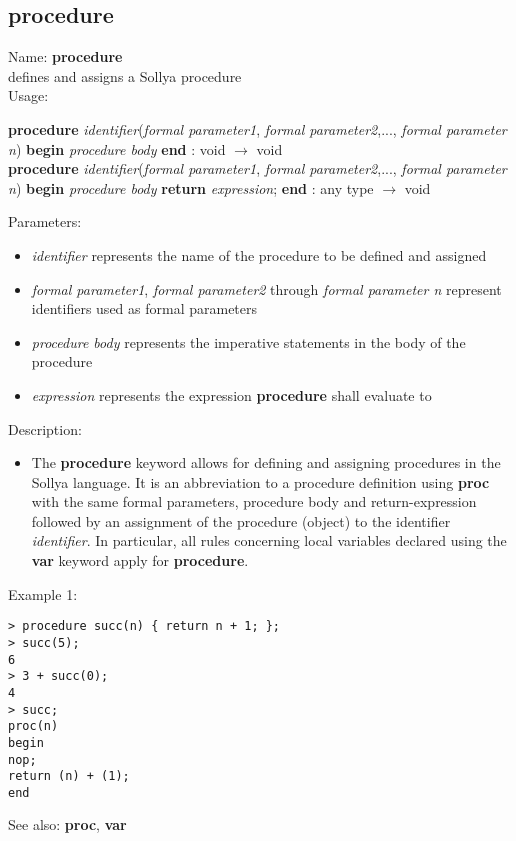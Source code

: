 \subsection{ procedure }
\noindent Name: \textbf{procedure}\\
defines and assigns a Sollya procedure\\

\noindent Usage: 
\begin{center}
\textbf{procedure} \emph{identifier}(\emph{formal parameter1}, \emph{formal parameter2},..., \emph{formal parameter n}) \textbf{begin} \emph{procedure body} \textbf{end} : \textsf{void} $\rightarrow$ \textsf{void}\\
\textbf{procedure} \emph{identifier}(\emph{formal parameter1}, \emph{formal parameter2},..., \emph{formal parameter n}) \textbf{begin} \emph{procedure body} \textbf{return} \emph{expression}; \textbf{end} : \textsf{any type} $\rightarrow$ \textsf{void}\\
\end{center}
Parameters: 
\begin{itemize}
\item \emph{identifier} represents the name of the procedure to be defined and assigned
\item \emph{formal parameter1}, \emph{formal parameter2} through \emph{formal parameter n} represent identifiers used as formal parameters
\item \emph{procedure body} represents the imperative statements in the body of the procedure
\item \emph{expression} represents the expression \textbf{procedure} shall evaluate to
\end{itemize}
\noindent Description: \begin{itemize}

\item The \textbf{procedure} keyword allows for defining and assigning procedures in
   the Sollya language. It is an abbreviation to a procedure definition
   using \textbf{proc} with the same formal parameters, procedure body and
   return-expression followed by an assignment of the procedure (object)
   to the identifier \emph{identifier}. In particular, all rules concerning
   local variables declared using the \textbf{var} keyword apply for \textbf{procedure}.
\end{itemize}
\noindent Example 1: 
\begin{center}\begin{minipage}{15cm}\begin{Verbatim}[frame=single]
> procedure succ(n) { return n + 1; };
> succ(5);
6
> 3 + succ(0);
4
> succ;
proc(n)
begin
nop;
return (n) + (1);
end
\end{Verbatim}
\end{minipage}\end{center}
See also: \textbf{proc}, \textbf{var}

